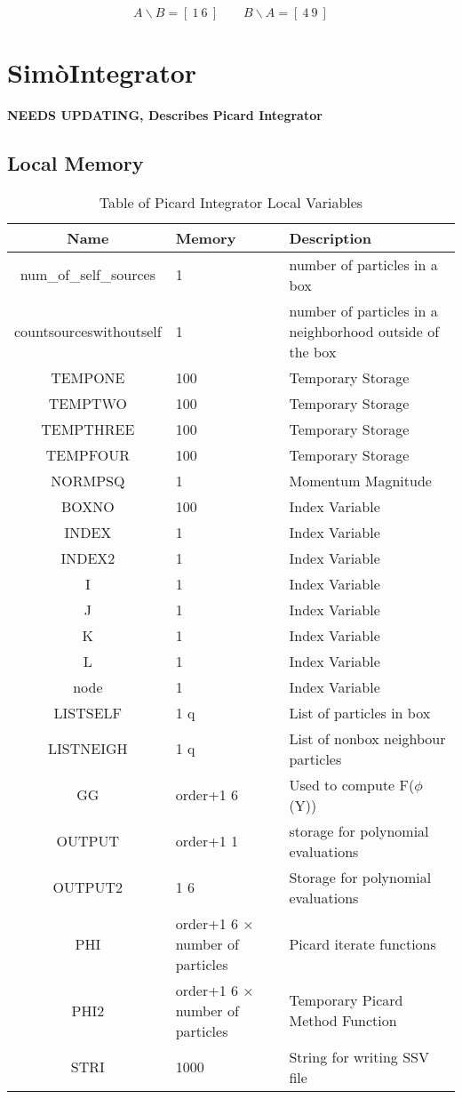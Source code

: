 \documentclass[oneside,12pt]{book}
\newcommand{\Simo}{Sim\`{o}}
\begin{document}
\[A \backslash B = [ \ 1 \ 6 \ ] \qquad B \backslash A= [ \ 4 \ 9 \ ]\]

\clearpage

\section{\Simo Integrator}

{\bf\color{red} NEEDS UPDATING, Describes Picard Integrator}

\subsection{Local Memory}
\begin{center}
\begin{table}[ht]
\begin{tabular}{|c|p{1.5in}|p{2.5in}|}
\hline
\textbf{Name} & \textbf{Memory} & \textbf{Description}\\
\hline
num\_of\_self\_sources & 1 & number of particles in a box\\
\hline
countsourceswithoutself & 1 & number of particles in a neighborhood outside of the box\\
\hline
TEMPONE & 100 & Temporary Storage\\
\hline
TEMPTWO & 100 & Temporary Storage\\
\hline
TEMPTHREE & 100 & Temporary Storage\\
\hline
TEMPFOUR & 100 & Temporary Storage\\
\hline
NORMPSQ & 1 & Momentum Magnitude\\
\hline
BOXNO & 100 & Index Variable\\
\hline
INDEX & 1 & Index Variable\\
\hline
INDEX2 & 1 & Index Variable\\
\hline
I & 1 & Index Variable\\
\hline
J & 1 & Index Variable\\
\hline
K & 1 & Index Variable\\
\hline
L & 1 & Index Variable\\
\hline
node & 1 & Index Variable\\
\hline
LISTSELF & 1 q & List of particles in box\\
\hline
LISTNEIGH & 1 q & List of nonbox neighbour particles\\
\hline
GG & order+1 6 & Used to compute F($\phi$(Y))\\
\hline
OUTPUT & order+1 1 & storage for polynomial evaluations\\
\hline
OUTPUT2 & 1 6 & Storage for polynomial evaluations\\
\hline
PHI & order+1 6 $\times$ number of particles & Picard iterate functions\\
\hline
PHI2 & order+1 6 $\times$ number of particles & Temporary Picard Method Function\\
\hline
STRI & 1000 & String for writing SSV file\\
\hline
\end{tabular}
\caption{Table of Picard Integrator Local Variables}
\end{table}
\end{center}
\end{document}
